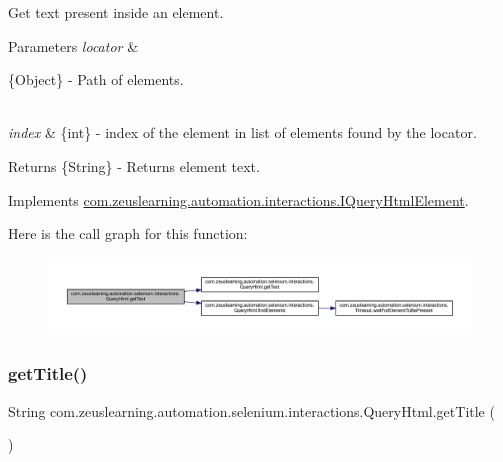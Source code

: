 Get text present inside an element.


\begin{DoxyParams}{Parameters}
{\em locator} & 
\begin{DoxyItemize}
\item \{Object\} -\/ Path of elements. 
\end{DoxyItemize}\\
\hline
{\em index} & \{int\} -\/ index of the element in list of elements found by the locator.\\
\hline
\end{DoxyParams}
\begin{DoxyReturn}{Returns}
\{String\} -\/ Returns element text. 
\end{DoxyReturn}


Implements \hyperlink{interfacecom_1_1zeuslearning_1_1automation_1_1interactions_1_1IQueryHtmlElement_aebeb5bdb3632e1bfc57aeee282074d14}{com.\+zeuslearning.\+automation.\+interactions.\+I\+Query\+Html\+Element}.

Here is the call graph for this function\+:
\nopagebreak
\begin{figure}[H]
\begin{center}
\leavevmode
\includegraphics[width=350pt]{dc/d41/classcom_1_1zeuslearning_1_1automation_1_1selenium_1_1interactions_1_1QueryHtml_a3f03bea9d1ab38fb888d2f2c629f297e_cgraph}
\end{center}
\end{figure}
\hypertarget{classcom_1_1zeuslearning_1_1automation_1_1selenium_1_1interactions_1_1QueryHtml_ad0bcb480f1543a6d81c3c83bd0a15773}{}\label{classcom_1_1zeuslearning_1_1automation_1_1selenium_1_1interactions_1_1QueryHtml_ad0bcb480f1543a6d81c3c83bd0a15773} 
\subsubsection{\texorpdfstring{get\+Title()}{getTitle()}}
{\footnotesize\ttfamily String com.\+zeuslearning.\+automation.\+selenium.\+interactions.\+Query\+Html.\+get\+Title (\begin{DoxyParamCaption}{ }\end{DoxyParamCaption})\hspace{0.3cm}{\ttfamily [inline]}}

